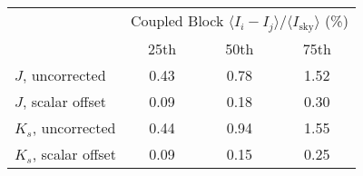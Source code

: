 \begin{tabular}{lccc}
& \multicolumn{3}{c}{Coupled Block
$\langle I_i - I_j\rangle / \langle I_\mathrm{sky} \rangle$ (\%)} \\
& 25th & 50th & 75th \\
\hline
$J$, uncorrected & 0.43 & 0.78 & 1.52 \\
$J$, scalar offset & 0.09 & 0.18 & 0.30 \\
\hline
$K_s$, uncorrected & 0.44 & 0.94 & 1.55 \\
$K_s$, scalar offset & 0.09 & 0.15 & 0.25 \\
\hline
\end{tabular}